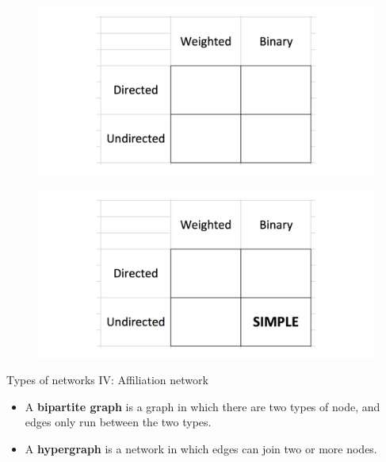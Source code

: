 \documentclass[10pt]{beamer}
\begin{document}
\begin{frame}
	\begin{figure}
	\centering
	\includegraphics[scale=0.43]{Figs/typeb}
	\end{figure}
\end{frame}

\begin{frame}
	\begin{figure}
	\centering
	\includegraphics[scale=0.43]{Figs/typea}
	\end{figure}
\end{frame}

\begin{frame}{Types of networks IV: Affiliation network}
	\begin{itemize}
		\item A \textbf{bipartite graph} is a graph in which there are two types of node, and edges only run between the two types.
		
		\item A \textbf{hypergraph} is a network in which edges can join two or more nodes.
	\end{itemize}
\end{frame}
\end{document}
